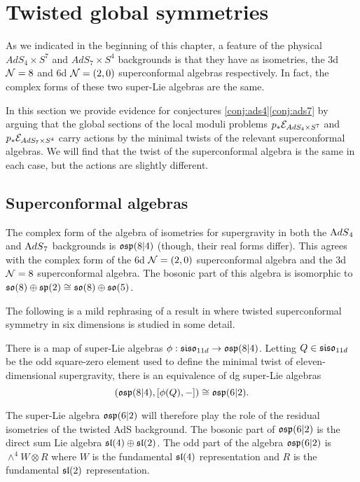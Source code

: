 \section{Twisted global symmetries}
\label{sec:ads}
As we indicated in the beginning of this chapter, a feature of the physical $AdS_4\times S^7$ and $AdS_7\times S^4$ backgrounds is that they have as isometries, the 3d $\mathcal{N}=8$ and 6d $\mathcal{N}=(2,0)$ superconformal algebras respectively. In fact, the complex forms of these two super-Lie algebras are the same. 

In this section we provide evidence for conjectures \ref{conj:ads4}\ref{conj:ads7} by arguing that the global sections of the local moduli problems $p_*\mathcal{E}_{AdS_4\times S^7}$ and $p_* \mathcal{E}_{AdS_7\times S^4}$ carry actions by the minimal twists of the relevant superconformal algebras. We will find that the twist of the superconformal algebra is the same in each case, but the actions are slightly different. 

\subsection{Superconformal algebras}

The complex form of the algebra of isometries for supergravity in both the ${\mathrm{A}dS}_4$ and ${\mathrm{A}dS}_7$ backgrounds is $\mathfrak{osp}(8|4)$ (though, their real forms differ). 
This agrees with the complex form of the 6d $\mathcal{N}=(2,0)$ superconformal algebra and the 3d $\mathcal{N}=8$ superconformal algebra. The bosonic part of this algebra is isomorphic to $\mathfrak{so}(8) \oplus \mathfrak{sp}(2) \cong \mathfrak{so}(8) \oplus \mathfrak{so}(5)$. 

The following is a mild rephrasing of a result in \cite{SWsuco2} where twisted superconformal symmetry in six dimensions is studied in some detail. 
\begin{thm}
There is a map of super-Lie algebras $\phi: \mathfrak{siso}_{11d} \to \mathfrak{osp}(8|4)$. Letting $Q\in \mathfrak{siso}_{11d}$ be the odd square-zero element used to define the minimal twist of eleven-dimensional supergravity, there is an equivalence of dg super-Lie algebras \[\left ( \mathfrak{osp}(8|4), [\phi(Q), - ]\right )\cong \mathfrak{osp}(6|2).\]
\end{thm}

The super-Lie algebra $\mathfrak{osp}(6|2)$ will therefore play the role of the residual isometries of the twisted AdS background. The bosonic part of $\mathfrak{osp}(6|2)$ is the direct sum Lie algebra $\mathfrak{sl}(4) \oplus \mathfrak{sl}(2)$. The odd part of the algebra $\mathfrak{osp}(6|2)$ is $\wedge^4 W \otimes R$ where $W$ is the fundamental $\mathfrak{sl}(4)$ representation and $R$ is the fundamental $\mathfrak{sl}(2)$ representation. 

